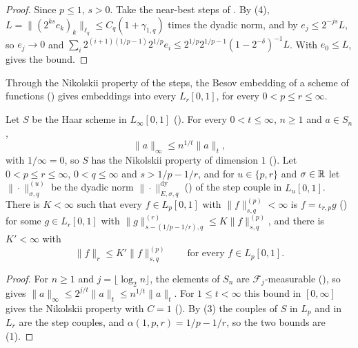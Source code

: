 \begin{proof}
\leanok
Since $p \leq 1$, $s > 0$. Take the near-best steps of . By
 (4),
$L = \|(2^{ks} e_k)_k\|_{\ell_q} \leq C_q (1 + \gamma_{1,q})$ times the dyadic norm, and by
 $e_j \leq 2^{-js} L$, so $e_j \to 0$ and
$\sum_i 2^{(i+1)(1/p-1)} 2^{1/p} e_i \leq 2^{1/p} 2^{1/p-1} (1 - 2^{-\delta})^{-1} L$. With
$e_0 \leq L$,  gives the bound.
\end{proof}

Through the Nikolskii property of the steps, the Besov embedding of a scheme of functions
() gives embeddings into every $L_r[0, 1]$, for every
$0 < p \leq r \leq \infty$.

\begin{corollary}
\label{cor:steps-embedding}
\leanok
{}
Let $S$ be the Haar scheme in $L_\infty[0, 1]$ (). For every
$0 < t \leq \infty$, $n \geq 1$ and $a \in S_n$,
\[
  \|a\|_\infty \leq n^{1/t} \|a\|_t ,
\]
with $1/\infty = 0$, so $S$ has the Nikolskii property of dimension $1$
(). Let $0 < p \leq r \leq \infty$, $0 < q \leq \infty$ and
$s > 1/p - 1/r$, and for $u \in \{p, r\}$ and $\sigma \in \mathbb{R}$ let $\|\cdot\|^{(u)}_{\sigma, q}$ be
the dyadic norm $\|\cdot\|^{\mathrm{dy}}_{E, \sigma, q}$ () of the step couple
in $L_u[0, 1]$. There is $K < \infty$ such that every $f \in L_p[0, 1]$ with
$\|f\|^{(p)}_{s, q} < \infty$ is $f = \iota_{r,p} g$ () for some
$g \in L_r[0, 1]$ with $\|g\|^{(r)}_{s - (1/p - 1/r), q} \leq K \|f\|^{(p)}_{s, q}$, and there
is $K' < \infty$ with
\[
  \|f\|_r \leq K' \|f\|^{(p)}_{s, q} \qquad \text{for every } f \in L_p[0, 1] .
\]
\end{corollary}

\begin{proof}
\leanok
{}
For $n \geq 1$ and $j = \lfloor \log_2 n \rfloor$, the elements of $S_n$ are
$\mathcal{F}_j$-measurable (), so  gives
$\|a\|_\infty \leq 2^{j/t} \|a\|_t \leq n^{1/t} \|a\|_t$. For $1 \leq t < \infty$ this bound in
$[0, \infty]$ gives the Nikolskii property with $C = 1$ (). By
(3) the couples of $S$ in $L_p$ and in $L_r$ are the step
couples, and $\alpha(1, p, r) = 1/p - 1/r$, so the two bounds are
(1).
\end{proof}

